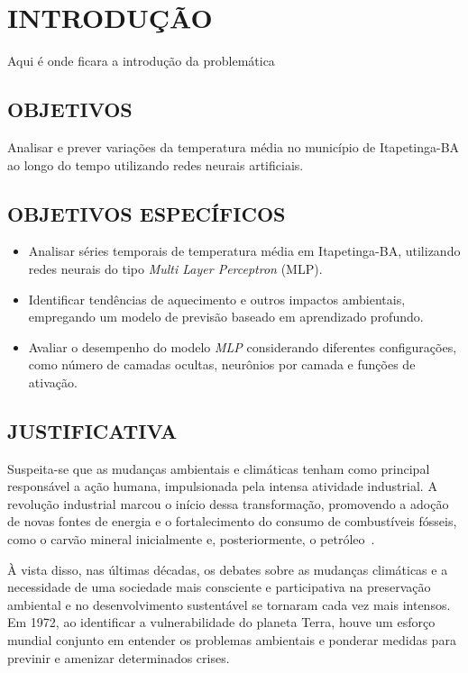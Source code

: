 \chapter{INTRODUÇÃO}

Aqui é onde ficara a introdução da problemática

\section{OBJETIVOS}
    Analisar e prever variações da temperatura média no município de Itapetinga-BA ao longo do tempo
    utilizando redes neurais artificiais.

\section{OBJETIVOS ESPECÍFICOS}
    \begin{itemize}
        \item Analisar séries temporais de temperatura média em Itapetinga-BA, utilizando redes neurais 
        do tipo \emph{Multi Layer Perceptron} (MLP).
        \item Identificar tendências de aquecimento e outros impactos ambientais, empregando um modelo 
        de previsão baseado em aprendizado profundo.
        \item Avaliar o desempenho do modelo \emph{MLP} considerando diferentes configurações, como número de 
        camadas ocultas, neurônios por camada e funções de ativação.
    \end{itemize}

\section{JUSTIFICATIVA}
    Suspeita-se que as mudanças ambientais e climáticas tenham como principal responsável a ação humana, 
    impulsionada pela intensa atividade industrial. A revolução industrial marcou o início dessa transformação, 
    promovendo a adoção de novas fontes de energia e o fortalecimento do consumo de combustíveis fósseis, como o 
    carvão mineral inicialmente e, posteriormente, o petróleo~\cite{mendoncca2006aquecimento}.
    
    À vista disso, nas últimas décadas, os debates sobre as mudanças climáticas e a necessidade de uma sociedade 
    mais consciente e participativa na preservação ambiental e no desenvolvimento sustentável se tornaram cada 
    vez mais intensos. Em 1972, ao identificar a vulnerabilidade do planeta Terra, houve um esforço mundial conjunto
    em entender os problemas ambientais e ponderar medidas para previnir e amenizar determinados crises.
    
